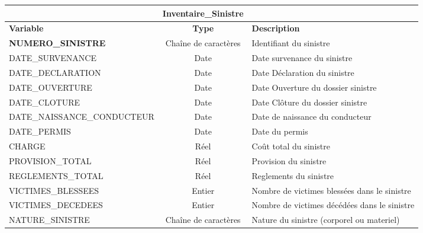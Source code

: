 {\footnotesize
\begin{center}
\begin{supertabular}{lcl}
\toprule 
& \textbf{Inventaire\_Sinistre} &  \\
\midrule
\textbf{Variable}                                 & \textbf{Type}                         & \textbf{Description}  \\
\hline 
\textbf{NUMERO\_SINISTRE}                          & Cha\^ine de caract\`eres    & Identifiant du sinistre   \\ 
DATE\_SURVENANCE                          & Date                        & Date survenance du sinistre   \\ 
DATE\_DECLARATION                         & Date                        & Date Déclaration du sinistre   \\ 
DATE\_OUVERTURE                           & Date                        & Date Ouverture du dossier sinistre   \\ 
DATE\_CLOTURE                             & Date                        & Date Clôture du dossier sinistre\\ 
DATE\_NAISSANCE\_CONDUCTEUR               & Date                        & Date de naissance du conducteur   \\ 
DATE\_PERMIS                              & Date                        & Date du permis\\ 
CHARGE                                    & R\'eel                      & Coût total du sinistre   \\ 
PROVISION\_TOTAL                          & R\'eel                      & Provision du sinistre   \\ 
REGLEMENTS\_TOTAL                         & R\'eel                      & Reglements du sinistre   \\ 
VICTIMES\_BLESSEES                        & Entier                     & Nombre de victimes blessées dans le sinistre \\
VICTIMES\_DECEDEES                        & Entier                     & Nombre de victimes décédées dans le sinistre\\
NATURE\_SINISTRE                          & Cha\^ine de caract\`eres    & Nature du sinistre (corporel ou materiel) \\
\bottomrule
\end{supertabular}
\end{center}}

